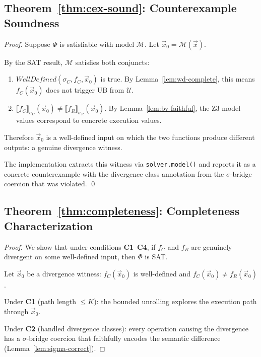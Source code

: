 \documentclass[10pt,a4paper]{article}
\begin{document}
\begin{appendices}
\subsection{Theorem~\ref{thm:cex-sound}: Counterexample Soundness}

\begin{proof}
Suppose $\Phi$ is satisfiable with model $\mathcal{M}$.  Let
$\vec{x}_0 = \mathcal{M}(\vec{x})$.

By the SAT result, $\mathcal{M}$ satisfies both conjuncts:
\begin{enumerate}
  \item $\mathit{WellDefined}(\sigma_C, f_C, \vec{x}_0)$ is true.
    By Lemma~\ref{lem:wd-complete}, this means $f_C(\vec{x}_0)$
    does not trigger UB from $\mathcal{U}$.

  \item $\llbracket f_C \rrbracket_{\sigma_C}(\vec{x}_0) \neq
    \llbracket f_R \rrbracket_{\sigma_R}(\vec{x}_0)$.
    By Lemma~\ref{lem:bv-faithful}, the Z3 model values correspond
    to concrete execution values.
\end{enumerate}

Therefore $\vec{x}_0$ is a well-defined input on which the two
functions produce different outputs: a genuine divergence witness.

The implementation extracts this witness via
\texttt{solver.model()} and reports it as a concrete
counterexample with the divergence class annotation from the
$\sigma$-bridge coercion that was violated.  \qed
\end{proof}

\subsection{Theorem~\ref{thm:completeness}: Completeness
Characterization}

\begin{proof}
We show that under conditions \textbf{C1}--\textbf{C4}, if $f_C$ and
$f_R$ are genuinely divergent on some well-defined input, then $\Phi$
is SAT.

Let $\vec{x}_0$ be a divergence witness: $f_C(\vec{x}_0)$ is
well-defined and $f_C(\vec{x}_0) \neq f_R(\vec{x}_0)$.

Under \textbf{C1} (path length $\leq K$): the bounded unrolling
explores the execution path through $\vec{x}_0$.

Under \textbf{C2} (handled divergence classes): every operation
causing the divergence has a $\sigma$-bridge coercion that
faithfully encodes the semantic difference
(Lemma~\ref{lem:sigma-correct}).


\end{proof}
\end{appendices}
\end{document}
